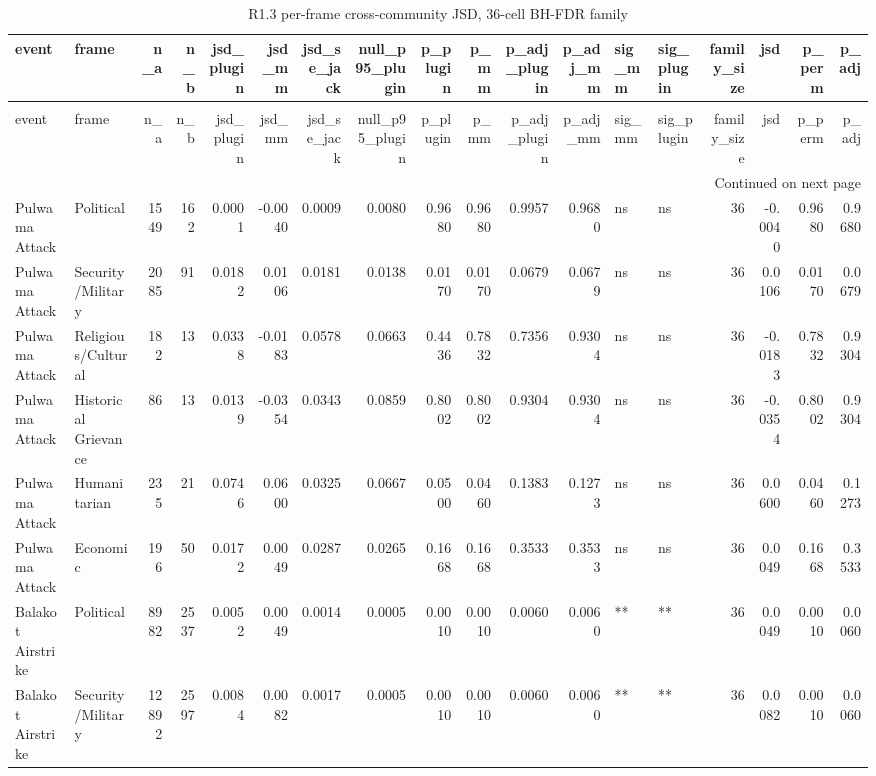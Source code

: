 \begin{longtable}{llrrrrrrrrrrllrrrr}
\caption{R1.3 per-frame cross-community JSD, 36-cell BH-FDR family} \label{tab:r1r2_per_frame_jsd} \\
\toprule
event & frame & n\_a & n\_b & jsd\_plugin & jsd\_mm & jsd\_se\_jack & null\_p95\_plugin & p\_plugin & p\_mm & p\_adj\_plugin & p\_adj\_mm & sig\_mm & sig\_plugin & family\_size & jsd & p\_perm & p\_adj \\
\midrule
\endfirsthead
\caption[]{R1.3 per-frame cross-community JSD, 36-cell BH-FDR family} \\
\toprule
event & frame & n\_a & n\_b & jsd\_plugin & jsd\_mm & jsd\_se\_jack & null\_p95\_plugin & p\_plugin & p\_mm & p\_adj\_plugin & p\_adj\_mm & sig\_mm & sig\_plugin & family\_size & jsd & p\_perm & p\_adj \\
\midrule
\endhead
\midrule
\multicolumn{18}{r}{Continued on next page} \\
\midrule
\endfoot
\bottomrule
\endlastfoot
Pulwama Attack & Political & 1549 & 162 & 0.0001 & -0.0040 & 0.0009 & 0.0080 & 0.9680 & 0.9680 & 0.9957 & 0.9680 & ns & ns & 36 & -0.0040 & 0.9680 & 0.9680 \\
Pulwama Attack & Security/Military & 2085 & 91 & 0.0182 & 0.0106 & 0.0181 & 0.0138 & 0.0170 & 0.0170 & 0.0679 & 0.0679 & ns & ns & 36 & 0.0106 & 0.0170 & 0.0679 \\
Pulwama Attack & Religious/Cultural & 182 & 13 & 0.0338 & -0.0183 & 0.0578 & 0.0663 & 0.4436 & 0.7832 & 0.7356 & 0.9304 & ns & ns & 36 & -0.0183 & 0.7832 & 0.9304 \\
Pulwama Attack & Historical Grievance & 86 & 13 & 0.0139 & -0.0354 & 0.0343 & 0.0859 & 0.8002 & 0.8002 & 0.9304 & 0.9304 & ns & ns & 36 & -0.0354 & 0.8002 & 0.9304 \\
Pulwama Attack & Humanitarian & 235 & 21 & 0.0746 & 0.0600 & 0.0325 & 0.0667 & 0.0500 & 0.0460 & 0.1383 & 0.1273 & ns & ns & 36 & 0.0600 & 0.0460 & 0.1273 \\
Pulwama Attack & Economic & 196 & 50 & 0.0172 & 0.0049 & 0.0287 & 0.0265 & 0.1668 & 0.1668 & 0.3533 & 0.3533 & ns & ns & 36 & 0.0049 & 0.1668 & 0.3533 \\
Balakot Airstrike & Political & 8982 & 2537 & 0.0052 & 0.0049 & 0.0014 & 0.0005 & 0.0010 & 0.0010 & 0.0060 & 0.0060 & ** & ** & 36 & 0.0049 & 0.0010 & 0.0060 \\
Balakot Airstrike & Security/Military & 12892 & 2597 & 0.0084 & 0.0082 & 0.0017 & 0.0005 & 0.0010 & 0.0010 & 0.0060 & 0.0060 & ** & ** & 36 & 0.0082 & 0.0010 & 0.0060 \\

\end{longtable}
